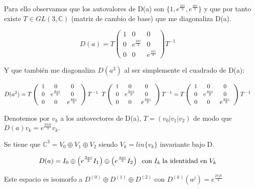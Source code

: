 \documentclass{article}
\begin{document}
\smallskip
Para ello observamos que los autovalores de D(a) son $\lbrace 1,e^{\frac{2\pi i}{3}}, e^{\frac{4\pi i}{3}}\rbrace$ y que por tanto existe $T\in GL(3,\mathds{C})$ (matriz de cambio de base) que me diagonaliza D(a).

    $$D(a)=T\left ( \begin{array}{ccc}
         1 & 0 & 0 \\
         0 & e^{\frac{2\pi i}{3}} & 0 \\
         0 & 0 & e^{\frac{4\pi i}{3}}
    \end{array}\right )T^{-1}$$

Y que también me diagonaliza $D(a^2)$ al ser simplemente el cuadrado de D(a):

$$D(a^2)=T\left ( \begin{array}{ccc}
         1 & 0 & 0 \\
         0 & e^{\frac{2\pi i}{3}} & 0 \\
         0 & 0 & e^{\frac{4\pi i}{3}}
    \end{array}\right )T^{-1} \hspace{0.2cm} T\left ( \begin{array}{ccc}
         1 & 0 & 0 \\
         0 & e^{\frac{2\pi i}{3}} & 0 \\
         0 & 0 & e^{\frac{4\pi i}{3}}
    \end{array}\right )T^{-1}=T\left ( \begin{array}{ccc}
         1 & 0 & 0 \\
         0 & e^{\frac{4\pi i}{3}} & 0 \\
         0 & 0 & e^{\frac{2\pi i}{3}}
    \end{array}\right )T^{-1}$$

    \smallskip
    Denotemos por $v_k$ a los autovectores de D(a), $T=(v_0 |v_1 | v_2)$ de modo que $D(a)v_k=e^{\frac{2\pi i k}{3}} v_k$.

    \smallskip
    Se tiene que $\mathds{C}^3=V_0\oplus V_1 \oplus V_2$ siendo $V_k=lin\lbrace v_k \rbrace$ invariante bajo D.

    $$D(a)=I_0 \oplus \left ( e^{\frac{2\pi i}{3}}I_1\right) \oplus \left( e^{\frac{4\pi i}{3}}I_2\right) \hspace{0.2cm} \text{con} \hspace{0.1cm} I_k \hspace{0.1cm} \text{la identidad en} \hspace{0.1cm} V_k$$

    Este espacio es isomorfo a $D^{(0)}\oplus D^{(1)}\oplus D^{(2)}$ con $D^{(k)}(a^j)=e^{\frac{2\pi jk}{3}}$
\end{document}

